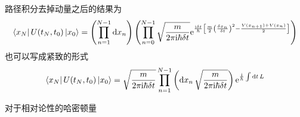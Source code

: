 \documentclass{ctexart}
\begin{document}
路径积分去掉动量之后的结果为
\begin{equation}
  \bra{x_{N}}U(t_N, t_0) \ket{x_0} = \left( \prod_{n=1}^{N-1} \mathrm{d} x_n \right) 
  \left( \prod_{n=0}^{N-1} \sqrt{\frac{m}{2\pi \mathrm{i} \hbar \delta t }}\mathrm{e}^{ \frac{\mathrm{i} \delta t}{\hbar}\left[ \frac{m}{2} \left( \frac{\delta x_n}{\delta t} \right) ^2 - \frac{V(x_{n+1}) + V(x_n)}{2} \right] }  \right) 
\end{equation}
也可以写成紧致的形式
\begin{equation}
  \bra{x_N}U(t_N, t_0)\ket{x_0} = \sqrt{\frac{m}{2\pi \mathrm{i}  \hbar \delta t}} \prod_{n=1}^{N-1} \left( \mathrm{d} x_n \, \sqrt{\frac{m}{2\pi \mathrm{i}  \hbar \delta t}} \right) \mathrm{e}^{\frac{\mathrm{i} }{\hbar}\int \mathrm{d} t \,L}
\end{equation}

对于相对论性的哈密顿量
\end{document}
